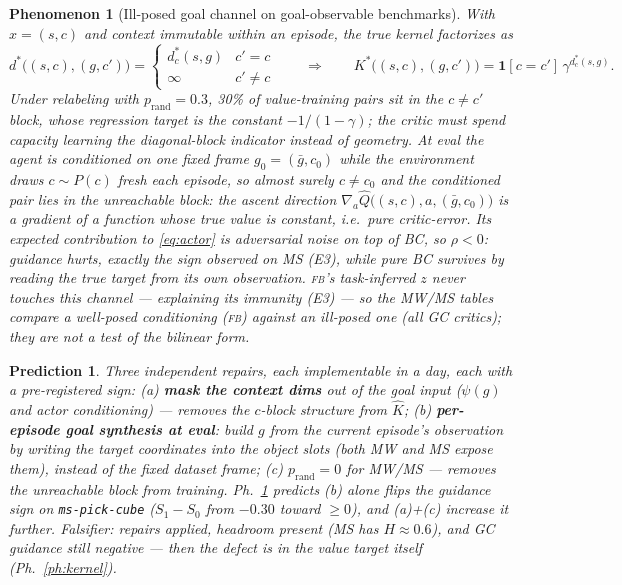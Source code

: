 \documentclass[10pt]{article}
\newtheorem{phenomenon}{Phenomenon}
\newtheorem{prediction}{Prediction}
\begin{document}
\begin{phenomenon}[Ill-posed goal channel on goal-observable benchmarks]\label{ph:context}
With $x=(s,c)$ and context immutable within an episode, the true kernel factorizes as
\begin{equation}
d^*\big((s,c),(g,c')\big)=\begin{cases} d^*_c(s,g) & c'=c\\ \infty & c'\ne c\end{cases}
\qquad\Longrightarrow\qquad
K^*\big((s,c),(g,c')\big)=\mathbf{1}[c{=}c']\,\gamma^{d^*_c(s,g)}.
\label{eq:context}
\end{equation}
Under relabeling with $p_{\mathrm{rand}}=0.3$, 30\% of value-training pairs sit in the
$c\ne c'$ block, whose regression target is the constant $-1/(1-\gamma)$; the critic must
spend capacity learning the diagonal-block indicator instead of geometry. At eval the agent
is conditioned on one fixed frame $g_0=(\bar g,c_0)$ while the environment draws
$c\sim P(c)$ fresh each episode, so almost surely $c\ne c_0$ and the conditioned pair lies
in the unreachable block: the ascent direction
$\nabla_a \hat Q\big((s,c),a,(\bar g,c_0)\big)$ is a gradient of a function whose true value
is constant, i.e.\ pure critic-error. Its expected contribution to \eqref{eq:actor} is
adversarial noise on top of BC, so $\rho<0$: guidance \emph{hurts}, exactly the sign
observed on MS (E3), while pure BC survives by reading the true target from its own
observation. \textsc{fb}'s task-inferred $z$ never touches this channel --- explaining its
immunity (E3) --- so the MW/MS tables compare a well-posed conditioning (\textsc{fb})
against an ill-posed one (all GC critics); they are not a test of the bilinear form.
\end{phenomenon}

\begin{prediction}\label{pred:context}
Three independent repairs, each implementable in a day, each with a pre-registered sign:
(a) \textbf{mask the context dims} out of the goal input ($\psi(g)$ and actor conditioning)
--- removes the $c$-block structure from $\hat K$;
(b) \textbf{per-episode goal synthesis at eval}: build $g$ from the \emph{current} episode's
observation by writing the target coordinates into the object slots (both MW and MS expose
them), instead of the fixed dataset frame;
(c) \textbf{$p_{\mathrm{rand}}=0$} for MW/MS --- removes the unreachable block from training.
Ph.~\ref{ph:context} predicts (b) alone flips the guidance sign on \texttt{ms-pick-cube}
($S_1-S_0$ from $-0.30$ toward $\ge 0$), and (a)+(c) increase it further. Falsifier: repairs
applied, headroom present (MS has $H\approx0.6$), and GC guidance still negative --- then
the defect is in the value target itself (Ph.~\ref{ph:kernel}).
\end{prediction}
\end{document}
